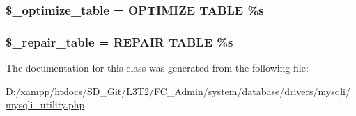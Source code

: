 \subsubsection[{\$\+\_\+optimize\+\_\+table}]{\setlength{\rightskip}{0pt plus 5cm}\$\+\_\+optimize\+\_\+table = \textquotesingle{}O\+P\+T\+I\+M\+I\+Z\+E T\+A\+B\+L\+E \%s\textquotesingle{}\hspace{0.3cm}{\ttfamily [protected]}}\label{class_c_i___d_b__mysqli__utility_a083199e5c22c78912dae0a47bb2d7fad}
\hypertarget{class_c_i___d_b__mysqli__utility_a5cf925cbd52e3f6ba5b7ada3fa436efc}{}
\subsubsection[{\$\+\_\+repair\+\_\+table}]{\setlength{\rightskip}{0pt plus 5cm}\$\+\_\+repair\+\_\+table = \textquotesingle{}R\+E\+P\+A\+I\+R T\+A\+B\+L\+E \%s\textquotesingle{}\hspace{0.3cm}{\ttfamily [protected]}}\label{class_c_i___d_b__mysqli__utility_a5cf925cbd52e3f6ba5b7ada3fa436efc}


The documentation for this class was generated from the following file\+:\begin{DoxyCompactItemize}
\item 
D\+:/xampp/htdocs/\+S\+D\+\_\+\+Git/\+L3\+T2/\+F\+C\+\_\+\+Admin/system/database/drivers/mysqli/\hyperlink{mysqli__utility_8php}{mysqli\+\_\+utility.\+php}\end{DoxyCompactItemize}
